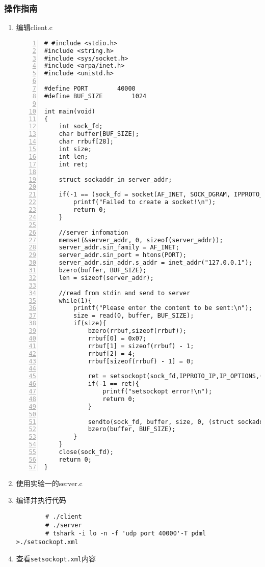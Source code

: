 \documentclass{article}
\begin{document}
\subsubsection{操作指南}
\begin{enumerate}

	\item 编辑client.c
\begin{lstlisting}[numbers=left]
# #include <stdio.h>
#include <string.h>
#include <sys/socket.h>
#include <arpa/inet.h>
#include <unistd.h>

#define PORT		40000
#define BUF_SIZE        1024

int main(void)
{
	int sock_fd;
	char buffer[BUF_SIZE];
	char rrbuf[28];
	int size;
	int len;
	int ret;

	struct sockaddr_in server_addr;

	if(-1 == (sock_fd = socket(AF_INET, SOCK_DGRAM, IPPROTO_IP)) ){
		printf("Failed to create a socket!\n");
		return 0;
	}

	//server infomation
	memset(&server_addr, 0, sizeof(server_addr));
	server_addr.sin_family = AF_INET;
	server_addr.sin_port = htons(PORT);
	server_addr.sin_addr.s_addr = inet_addr("127.0.0.1");
	bzero(buffer, BUF_SIZE);
	len = sizeof(server_addr);

	//read from stdin and send to server
	while(1){
		printf("Please enter the content to be sent:\n");
		size = read(0, buffer, BUF_SIZE);
		if(size){
			bzero(rrbuf,sizeof(rrbuf));
			rrbuf[0] = 0x07;
			rrbuf[1] = sizeof(rrbuf) - 1;
			rrbuf[2] = 4;
			rrbuf[sizeof(rrbuf) - 1] = 0;
			
			ret = setsockopt(sock_fd,IPPROTO_IP,IP_OPTIONS,(void*)rrbuf,sizeof(rrbuf));
			if(-1 == ret){
				printf("setsockopt error!\n");
				return 0;
			}

			sendto(sock_fd, buffer, size, 0, (struct sockaddr*)&server_addr, len);
			bzero(buffer, BUF_SIZE);
		}
	}
	close(sock_fd);
	return 0;
}

\end{lstlisting}
    \item 使用实验一的server.c
    \item 编译并执行代码
    \begin{lstlisting}
        # ./client
        # ./server
        # tshark -i lo -n -f 'udp port 40000'-T pdml >./setsockopt.xml
    \end{lstlisting}
    \item 查看\verb|setsockopt.xml|内容
\end{enumerate}
\end{document}
